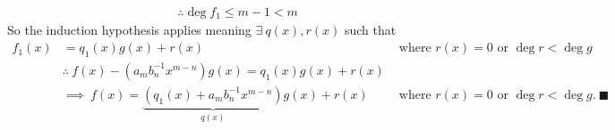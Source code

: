 \begin{lemma}
\begin{align}
    &\therefore \deg f_1 \leq m-1 < m \nonumber
\end{align}
So the induction hypothesis applies meaning $\exists \ q(x), r(x)$ such that 
\begin{align}
    f_1(x) &= q_1(x)g(x)+r(x) \ \  &\text{ where }r(x)=0 \text{ or } \deg r < \deg g \ \ \ \ \nonumber \\
    &\therefore \ f(x) - (a_m b_n^{-1}x^{m-n})g(x) = q_1(x)g(x) + r(x) &\nonumber \\
    &\implies \ f(x) = \underbrace{(q_1(x)+ a_m b_n^{-1}x^{m-n})}_{q(x)}g(x)+r(x) \ \ \ &\text{ where }r(x)=0 \text{ or } \deg r < \deg g. \ \blacksquare \nonumber 
\end{align}



\end{lemma}

